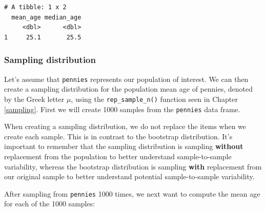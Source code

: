 \documentclass[12pt,]{krantz}
\makeatletter
\newenvironment{Shaded}{\begin{snugshade}}{\end{snugshade}}
\newcommand{\KeywordTok}[1]{\textcolor[rgb]{0.27,0.27,0.27}{\textbf{#1}}}
\newcommand{\DataTypeTok}[1]{\textcolor[rgb]{0.27,0.27,0.27}{#1}}
\newcommand{\DecValTok}[1]{\textcolor[rgb]{0.06,0.06,0.06}{#1}}
\newcommand{\StringTok}[1]{\textcolor[rgb]{0.5,0.5,0.5}{#1}}
\newcommand{\OtherTok}[1]{\textcolor[rgb]{0.37,0.37,0.37}{#1}}
\newcommand{\OperatorTok}[1]{\textcolor[rgb]{0.43,0.43,0.43}{\textbf{#1}}}
\newcommand{\NormalTok}[1]{#1}
\newenvironment{kframe}{%
\medskip{}
\setlength{\fboxsep}{.8em}
 \def\at@end@of@kframe{}%
 \ifinner\ifhmode%
  \def\at@end@of@kframe{\end{minipage}}%
  \begin{minipage}{\columnwidth}%
 \fi\fi%
 \def\FrameCommand##1{\hskip\@totalleftmargin \hskip-\fboxsep
 \colorbox{shadecolor}{##1}\hskip-\fboxsep
     \hskip-\linewidth \hskip-\@totalleftmargin \hskip\columnwidth}%
 \MakeFramed {\advance\hsize-\width
   \@totalleftmargin\z@ \linewidth\hsize
   \@setminipage}}%
 {\par\unskip\endMakeFramed%
 \at@end@of@kframe}
\renewenvironment{Shaded}{\begin{kframe}}{\end{kframe}}
\makeatother
\begin{document}
\begin{verbatim}
# A tibble: 1 x 2
  mean_age median_age
     <dbl>      <dbl>
1     25.1       25.5
\end{verbatim}

\subsubsection*{Sampling distribution}\label{sampling-distribution}


Let's assume that \texttt{pennies} represents our population of
interest. We can then create a sampling distribution for the population
mean age of pennies, denoted by the Greek letter \(\mu\), using the
\texttt{rep\_sample\_n()} function seen in Chapter \ref{sampling}. First
we will create 1000 samples from the \texttt{pennies} data frame.

\begin{Shaded}
\end{Shaded}

When creating a sampling distribution, we do not replace the items when
we create each sample. This is in contrast to the bootstrap
distribution. It's important to remember that the sampling distribution
is sampling \textbf{without} replacement from the population to better
understand sample-to-sample variability, whereas the bootstrap
distribution is sampling \textbf{with} replacement from our original
sample to better understand potential sample-to-sample variability.

After sampling from \texttt{pennies} 1000 times, we next want to compute
the mean age for each of the 1000 samples:

\begin{Shaded}
\end{Shaded}
\end{document}

